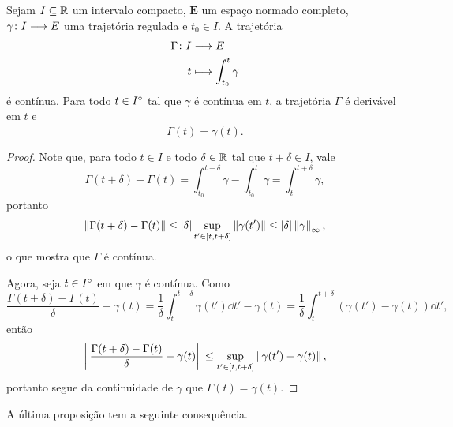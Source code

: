 \begin{proposition}
\label{prop:trajetoria.regulada.primitiva}
Sejam $I \subseteq \mathbb{R}$ um intervalo compacto, $\bm E$ um espaço normado completo, $\gamma\colon \allowbreak I \longrightarrow E$ uma trajetória regulada e $t_0 \in I$. A trajetória
	\begin{align*}
	{\Gamma}\colon {I} &\longrightarrow {E} \\{t} &\longmapsto \int_{t_0}^{t} \gamma
	\end{align*}
é contínua. Para todo $t \in {I}^\circ$ tal que $\gamma$ é contínua em $t$, a trajetória $\Gamma$ é derivável em $t$ e
	\begin{equation*}
	\dot\Gamma(t) = \gamma(t).
	\end{equation*}
\end{proposition}
\begin{proof}
Note que, para todo $t \in I$ e todo $\delta \in \mathbb{R}$ tal que $t+\delta \in I$, vale
	\begin{equation*}
	\Gamma(t+\delta) - \Gamma(t) = \int_{t_0}^{t+\delta} \gamma - \int_{t_0}^t \gamma = \int_t^{t+\delta} \gamma,
	\end{equation*}
portanto
	\begin{equation*}
	\left\Vert{\Gamma(t+\delta) - \Gamma(t)}\right\Vert \leq \left\vert{\delta}\right\vert\sup_{t' \in \left[t,\allowbreak t+\delta\right]} \left\Vert{\gamma(t')}\right\Vert \leq \left\vert{\delta}\right\vert\left\Vert{\gamma}\right\Vert_{\infty},
	\end{equation*}
o que mostra que $\Gamma$ é contínua.

Agora, seja $t \in {I}^\circ$ em que $\gamma$ é contínua. Como
	\begin{equation*}
	\frac{\Gamma(t+\delta) - \Gamma(t)}{\delta} - \gamma(t) = \frac{1}{\delta} \int_t^{t+\delta} \gamma(t') \dd t' - \gamma(t) = \frac{1}{\delta} \int_t^{t+\delta} (\gamma(t') - \gamma(t)) \dd t',
	\end{equation*}
então
	\begin{equation*}
	\left\Vert{\frac{\Gamma(t+\delta) - \Gamma(t)}{\delta} - \gamma(t)}\right\Vert \leq \sup_{t' \in \left[t,\allowbreak t+\delta\right]} \left\Vert{\gamma(t') - \gamma(t)}\right\Vert,
	\end{equation*}
portanto segue da continuidade de $\gamma$ que $\dot \Gamma (t) = \gamma(t)$.
\end{proof}

A última proposição tem a seguinte consequência.


